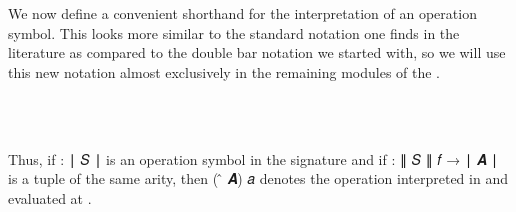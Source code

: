 We now define a convenient shorthand for the interpretation of an operation symbol. This looks more similar to the standard notation one finds in the literature as compared to the double bar notation we started with, so we will use this new notation almost exclusively in the remaining modules of the \ualib.
\ccpad
\begin{code}%
\>[1]\AgdaSpace{}%
\AgdaSymbol{:}\AgdaSpace{}%
\AgdaSymbol{(}\AgdaSpace{}%
\AgdaSymbol{:}\AgdaSpace{}%
\AgdaSpace{}%
\AgdaSpace{}%
\AgdaSymbol{)(}\AgdaSpace{}%
\AgdaSymbol{:}\AgdaSpace{}%
\AgdaSpace{}%
\AgdaSpace{}%
\AgdaSymbol{)}\AgdaSpace{}%
\AgdaSpace{}%
\AgdaSymbol{(}\AgdaSpace{}%
\AgdaSpace{}%
\AgdaSpace{}%
%
\>[48]%
\>[51]\AgdaSpace{}%
\AgdaSpace{}%
\AgdaSymbol{)}\AgdaSpace{}%
\AgdaSpace{}%
\AgdaSpace{}%
\AgdaSpace{}%
\<%
\\
%
\\[\AgdaEmptyExtraSkip]%
%
\>[1]\AgdaSpace{}%
\AgdaSpace{}%
\AgdaSpace{}%
\AgdaSymbol{=}\AgdaSpace{}%
\AgdaSpace{}%
\AgdaSpace{}%
\AgdaSpace{}%
\AgdaSymbol{(}\AgdaSpace{}%
\AgdaSpace{}%
\AgdaSpace{}%
\AgdaSymbol{)}\AgdaSpace{}%
\<%
\end{code}
\ccpad
Thus, if  \as : \af ∣ \ab 𝑆 \af ∣ is an operation symbol in the signature  and if  \as : \af ∥ \ab 𝑆 \af ∥ \ab 𝑓 \as → \af ∣ \ab 𝑨 \af ∣ is a tuple of the same arity, then ( \af ̂ \ab 𝑨) \ab 𝑎 denotes the operation  interpreted in  and evaluated at .


